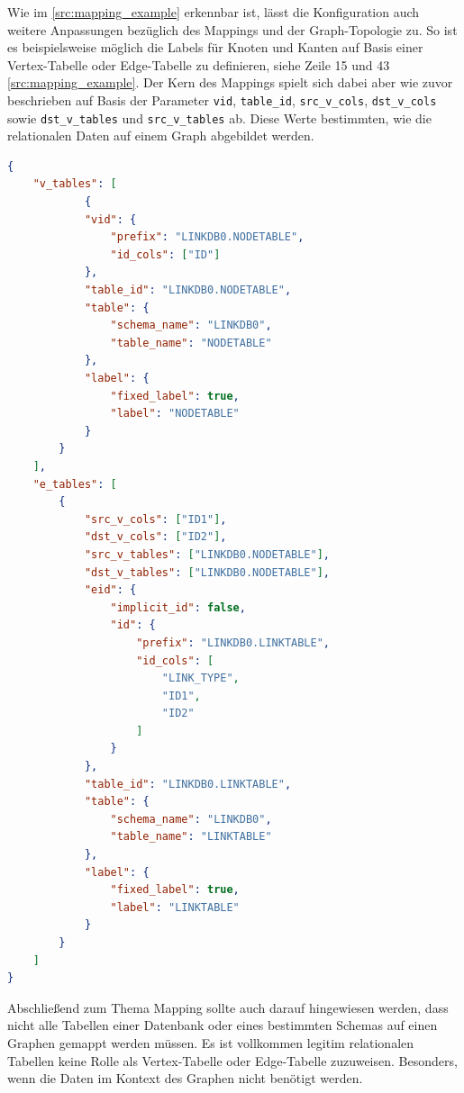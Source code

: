 Wie im \autoref{src:mapping_example} erkennbar ist, lässt die Konfiguration auch weitere Anpassungen bezüglich des Mappings und der Graph-Topologie zu. So ist es beispielsweise möglich die Labels für Knoten und Kanten auf Basis einer Vertex-Tabelle oder Edge-Tabelle zu definieren, siehe Zeile 15 und 43 \autoref{src:mapping_example}. Der Kern des Mappings spielt sich dabei aber wie zuvor beschrieben auf Basis der Parameter \texttt{vid}, \texttt{table\_id}, \texttt{src\_v\_cols}, \texttt{dst\_v\_cols} sowie \texttt{dst\_v\_tables} und \texttt{src\_v\_tables} ab. Diese Werte bestimmten, wie die relationalen Daten auf einem Graph abgebildet werden.

\begin{lstlisting}[caption={Beispiel Auschnitt Mapping Konfiguration},language=json,label=src:mapping_example]
{
    "v_tables": [
            {
            "vid": {
                "prefix": "LINKDB0.NODETABLE",
                "id_cols": ["ID"]
            },
            "table_id": "LINKDB0.NODETABLE",
            "table": {
                "schema_name": "LINKDB0",
                "table_name": "NODETABLE"
            },
            "label": {
                "fixed_label": true,
                "label": "NODETABLE"
            }
        }
    ],
    "e_tables": [
        {
            "src_v_cols": ["ID1"],
            "dst_v_cols": ["ID2"],
            "src_v_tables": ["LINKDB0.NODETABLE"],
            "dst_v_tables": ["LINKDB0.NODETABLE"],
            "eid": {
                "implicit_id": false,
                "id": {
                    "prefix": "LINKDB0.LINKTABLE",
                    "id_cols": [
                        "LINK_TYPE",
                        "ID1",
                        "ID2"
                    ]
                }
            },
            "table_id": "LINKDB0.LINKTABLE",
            "table": {
                "schema_name": "LINKDB0",
                "table_name": "LINKTABLE"
            },
            "label": {
                "fixed_label": true,
                "label": "LINKTABLE"
            }
        }
    ]
}
\end{lstlisting}

Abschließend zum Thema Mapping sollte auch darauf hingewiesen werden, dass nicht alle Tabellen einer Datenbank oder eines bestimmten Schemas auf einen Graphen gemappt werden müssen. Es ist vollkommen legitim relationalen Tabellen keine Rolle als Vertex-Tabelle oder Edge-Tabelle zuzuweisen. Besonders, wenn die Daten im Kontext des Graphen nicht benötigt werden. 

